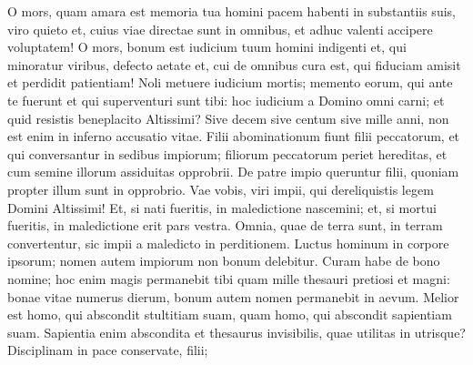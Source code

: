 \begin{biblechapter}
\begin{biblechapter}
\begin{biblechapter}
\begin{biblechapter}
\begin{biblechapter}
\begin{biblechapter}
\begin{biblechapter}
\begin{biblechapter}
\begin{biblechapter}
\begin{biblechapter}
\begin{biblechapter}
\begin{biblechapter}
\begin{biblechapter}
\begin{biblechapter}
\begin{biblechapter}
\begin{biblechapter}
\begin{biblechapter}
\begin{biblechapter}
\begin{biblechapter}
\begin{biblechapter}
\begin{biblechapter}
\begin{biblechapter}
\begin{biblechapter}
\begin{biblechapter}
\begin{biblechapter}
\begin{biblechapter}
\begin{biblechapter}
\begin{biblechapter}
\begin{biblechapter}
\begin{biblechapter}
\begin{biblechapter}
\begin{biblechapter}
\begin{biblechapter}
\begin{biblechapter}
\begin{biblechapter}
\begin{biblechapter}
\begin{biblechapter}
\begin{biblechapter}
\begin{biblechapter}
\begin{biblechapter}
\begin{biblechapter}
\verse O mors, quam amara est memoria tua
 homini pacem habenti in substantiis suis,
 \verse viro quieto et, cuius viae directae sunt in omnibus,
 et adhuc valenti accipere voluptatem!
 \verse O mors, bonum est iudicium tuum
 homini indigenti et, qui minoratur viribus,
 \verse defecto aetate et, cui de omnibus cura est,
 qui fiduciam amisit et perdidit patientiam!
 \verse Noli metuere iudicium mortis;
 memento eorum, qui ante te fuerunt
 et qui superventuri sunt tibi:
 hoc iudicium a Domino omni carni;
 \verse et quid resistis beneplacito Altissimi?
 Sive decem sive centum sive mille anni,
 \verse non est enim in inferno accusatio vitae.
 \verse Filii abominationum fiunt filii peccatorum,
 et qui conversantur in sedibus impiorum;
 \verse filiorum peccatorum periet hereditas,
 et cum semine illorum assiduitas opprobrii.
 \verse De patre impio queruntur filii,
 quoniam propter illum sunt in opprobrio.
 \verse Vae vobis, viri impii,
 qui dereliquistis legem Domini Altissimi!
 \verse Et, si nati fueritis, in maledictione nascemini;
 et, si mortui fueritis, in maledictione erit pars vestra.
 \verse Omnia, quae de terra sunt, in terram convertentur,
 sic impii a maledicto in perditionem.
 \verse Luctus hominum in corpore ipsorum;
 nomen autem impiorum non bonum delebitur.
 \verse Curam habe de bono nomine;
 hoc enim magis permanebit tibi
 quam mille thesauri pretiosi et magni:
 \verse bonae vitae numerus dierum,
 bonum autem nomen permanebit in aevum.
 \verse Melior est homo, qui abscondit stultitiam suam,
 quam homo, qui abscondit sapientiam suam.
 Sapientia enim abscondita et thesaurus invisibilis,
 quae utilitas in utrisque?
 \verse Disciplinam in pace conservate, filii;

\end{biblechapter}
\end{biblechapter}
\end{biblechapter}
\end{biblechapter}
\end{biblechapter}
\end{biblechapter}
\end{biblechapter}
\end{biblechapter}
\end{biblechapter}
\end{biblechapter}
\end{biblechapter}
\end{biblechapter}
\end{biblechapter}
\end{biblechapter}
\end{biblechapter}
\end{biblechapter}
\end{biblechapter}
\end{biblechapter}
\end{biblechapter}
\end{biblechapter}
\end{biblechapter}
\end{biblechapter}
\end{biblechapter}
\end{biblechapter}
\end{biblechapter}
\end{biblechapter}
\end{biblechapter}
\end{biblechapter}
\end{biblechapter}
\end{biblechapter}
\end{biblechapter}
\end{biblechapter}
\end{biblechapter}
\end{biblechapter}
\end{biblechapter}
\end{biblechapter}
\end{biblechapter}
\end{biblechapter}
\end{biblechapter}
\end{biblechapter}
\end{biblechapter}
